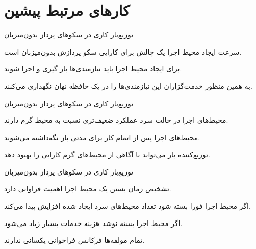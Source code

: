 \section{کارهای مرتبط پیشین}

\begin{frame}{توزیع‌بار کاری در سکو‌های پرداز بدون‌میزبان}
\begin{itemize}\RTList
	 سرعت ایجاد محیط اجرا یک چالش‌ برای کارایی سکو پردازش بدون‌میزبان است.
	
	 	برای ایجاد محیط اجرا باید نیازمندی‌ها بار گیری و اجرا شوند.
	
	 به همین منظور خدمت‌گزاران این نیازمندی‌ها را در یک حافظه نهان نگهداری می‌کنند.
\end{itemize}
	
\end{frame}


\begin{frame}{توزیع‌بار کاری در سکو‌های پرداز بدون‌میزبان}
	\begin{itemize}\RTList
		 محیط‌های اجرا در حالت سرد عملکرد ضعیف‌تری نسبت به محیط گرم دارند.
		
		 محیط‌های اجرا پس از اتمام کار برای مدتی باز نگه‌داشته می‌شوند.
		
		 توزیع‌کننده بار می‌تواند با آگاهی از محیط‌های گرم کارایی را بهبود دهد.
	\end{itemize}
	
\end{frame}


\begin{frame}{توزیع‌بار کاری در سکو‌های پرداز بدون‌میزبان}
	\begin{itemize}\RTList
		 تشخیص زمان بستن یک محیط اجرا اهمیت فراوانی دارد.
		
		 اگر محیط اجرا فورا بسته شود تعداد محیط‌های سرد ایجاد شده افزایش پیدا می‌کند.
		
		 اگر محیط اجرا بسته نوشد هزینه خدمات بسیار زیاد می‌شود.
		
		 تمام مولفه‌ها فرکانس فراخوانی یکسانی ندارند.
	\end{itemize}
	
\end{frame}


